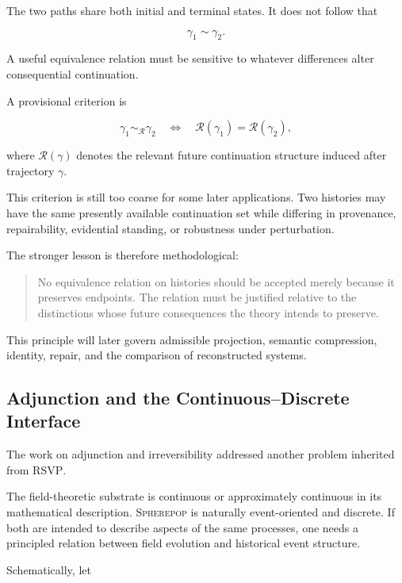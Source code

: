 \documentclass[11pt]{article}
\theoremstyle{remark}
\newcommand{\RSVP}{\textsc{RSVP}}
\newcommand{\Spherepop}{\textsc{Spherepop}}
\newcommand{\Reach}{\mathcal{R}}
\begin{document}
The two paths share both initial and terminal states. It does not follow that

\begin{equation}
\gamma_1\sim\gamma_2.
\end{equation}

A useful equivalence relation must be sensitive to whatever differences alter consequential continuation.

A provisional criterion is

\begin{equation}
\gamma_1\sim_{\Reach}\gamma_2
\quad\Longleftrightarrow\quad
\Reach(\gamma_1)
=
\Reach(\gamma_2),
\end{equation}

where $\Reach(\gamma)$ denotes the relevant future continuation structure induced after trajectory $\gamma$.

This criterion is still too coarse for some later applications. Two histories may have the same presently available continuation set while differing in provenance, repairability, evidential standing, or robustness under perturbation.

The stronger lesson is therefore methodological:

\begin{quote}
No equivalence relation on histories should be accepted merely because it preserves endpoints. The relation must be justified relative to the distinctions whose future consequences the theory intends to preserve.
\end{quote}

This principle will later govern admissible projection, semantic compression, identity, repair, and the comparison of reconstructed systems.

\subsection{Adjunction and the Continuous--Discrete Interface}

The work on adjunction and irreversibility addressed another problem inherited from \RSVP{}.

The field-theoretic substrate is continuous or approximately continuous in its mathematical description. \Spherepop{} is naturally event-oriented and discrete. If both are intended to describe aspects of the same processes, one needs a principled relation between field evolution and historical event structure.

Schematically, let
\end{document}
